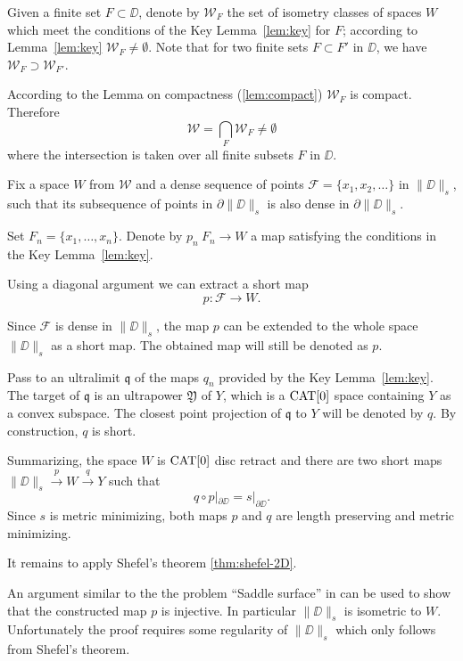 \documentclass[a4paper,10pt]{amsart}
\begin{document}
Given a finite set $F\subset \DD$,
denote by $\mathcal{W}_F$
the set of isometry classes of spaces $W$ which meet the conditions of the Key Lemma~\ref{lem:key}
for $F$;
according to Lemma~\ref{lem:key} $\mathcal{W}_F\ne\emptyset$.
Note that for two finite sets $F\subset F'$ in $\DD$,
we have $\mathcal{W}_F\supset \mathcal{W}_{F'}$.

According to the Lemma on compactness (\ref{lem:compact}) $\mathcal{W}_F$ is compact.
Therefore 
\[\mathcal{W}
=
\bigcap_{F}\mathcal{W}_F\ne \emptyset\]
where the intersection is taken over all finite subsets $F$ in $\DD$. 

Fix a space $W$ from $\mathcal{W}$
and a dense sequence of points $\mathcal{F}=\{x_1,x_2,\dots\}$ in $\|\DD\|_s$, 
such that its subsequence of points in $\partial \|\DD\|_s$ is
 also dense in $\partial \|\DD\|_s$.

Set $F_n=\{x_1,\dots,x_n\}$.
Denote by $p_n\:F_n\to W$ a map satisfying the conditions in the Key Lemma~\ref{lem:key}.

Using a diagonal argument we can extract a short map \[p:\mathcal{F}\to W.\]

Since $\mathcal{F}$ is dense in $\|\DD\|_s$,
the map $p$ can be extended to the whole space $\|\DD\|_s$ 
as a short map.
The obtained map will still be denoted as $p$.

Pass to an ultralimit $\mathfrak{q}$ of the maps $q_n$ provided by the Key Lemma~\ref{lem:key}. The target of $\mathfrak{q}$ is an ultrapower  $\mathfrak{Y}$ of $Y$,
which is a $\mathop{\rm CAT}\nolimits[0]$ space containing $Y$ as a convex subspace.
The closest point projection of $\mathfrak{q}$ to $Y$ will be denoted by $q$.
By construction, $q$ is short.


Summarizing, the space $W$ is $\mathop{\rm CAT}\nolimits[0]$ disc retract and
 there are two short maps 
$\|\DD\|_s\xrightarrow{p} W \xrightarrow{q} Y$
such that 
\[q\circ p|_{\partial\DD}=s|_{\partial\DD}.\] 
Since $s$ is metric minimizing, both maps $p$ and $q$ are length preserving and metric minimizing.

It remains to apply Shefel's theorem \ref{thm:shefel-2D}.


\qeds



 An argument similar to the the problem ``Saddle surface'' in \cite{petrunin-orthodox}
can be used to show that the constructed map $p$ 
is injective. 
In particular $\|\DD\|_s$ is isometric to $W$.
Unfortunately the proof requires some regularity of $\|\DD\|_s$ which only follows from Shefel's theorem. 
\end{document}
